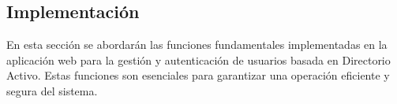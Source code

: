 \subsection{Implementación}

En esta sección se abordarán las funciones fundamentales implementadas en la aplicación web para la gestión y autenticación de usuarios basada en Directorio Activo. Estas funciones son esenciales para garantizar una operación eficiente y segura del sistema.



